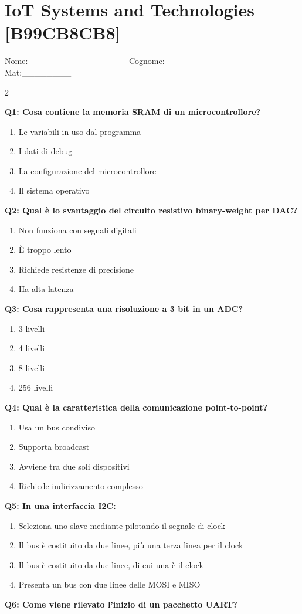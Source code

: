 \documentclass[10pt]{article}
\begin{document}
\section*{IoT Systems and Technologies \footnotesize [B99CB8CB8]}
{\footnotesize Nome:\_\_\_\_\_\_\_\_\_\_\_\_\_\_\_\_ Cognome:\_\_\_\_\_\_\_\_\_\_\_\_\_\_\_\_ Mat:\_\_\_\_\_\_\_\_}
\begin{multicols}{2}

\textbf{Q1: Cosa contiene la memoria SRAM di un microcontrollore?}

\begin{enumerate}[label=\arabic*.]
\item Le variabili in uso dal programma
\item I dati di debug
\item La configurazione del microcontrollore
\item Il sistema operativo
\end{enumerate}
\textbf{Q2: Qual è lo svantaggio del circuito resistivo binary-weight per DAC?}

\begin{enumerate}[label=\arabic*.]
\item Non funziona con segnali digitali
\item È troppo lento
\item Richiede resistenze di precisione
\item Ha alta latenza
\end{enumerate}
\textbf{Q3: Cosa rappresenta una risoluzione a 3 bit in un ADC?}

\begin{enumerate}[label=\arabic*.]
\item 3 livelli
\item 4 livelli
\item 8 livelli
\item 256 livelli
\end{enumerate}
\textbf{Q4: Qual è la caratteristica della comunicazione point-to-point?}

\begin{enumerate}[label=\arabic*.]
\item Usa un bus condiviso
\item Supporta broadcast
\item Avviene tra due soli dispositivi
\item Richiede indirizzamento complesso
\end{enumerate}
\textbf{Q5: In una interfaccia I2C:}

\begin{enumerate}[label=\arabic*.]
\item Seleziona uno slave mediante pilotando il segnale di clock
\item Il bus è costituito da due linee, più una terza linea per il clock
\item Il bus è costituito da due linee, di cui una è il clock
\item Presenta un bus con due linee delle MOSI e MISO
\end{enumerate}
\textbf{Q6: Come viene rilevato l’inizio di un pacchetto UART?}


\end{multicols}
\end{document}
